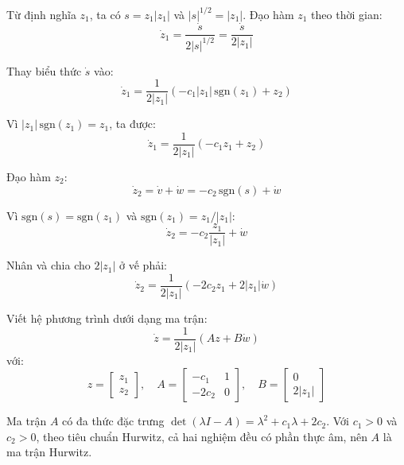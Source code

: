 \documentclass[12pt,a4paper]{report}
\begin{document}
Từ định nghĩa $z_1$, ta có $s = z_1 |z_1|$ và $|s|^{1/2} = |z_1|$. Đạo hàm $z_1$ theo thời gian:
\begin{equation}
\dot{z}_1 = \frac{\dot{s}}{2|s|^{1/2}} = \frac{\dot{s}}{2|z_1|}
\end{equation}

Thay biểu thức $\dot{s}$ vào:
\begin{equation}
\dot{z}_1 = \frac{1}{2|z_1|} \left( -c_1 |z_1| \, \text{sgn}(z_1) + z_2 \right)
\end{equation}

Vì $|z_1| \, \text{sgn}(z_1) = z_1$, ta được:
\begin{equation}
\dot{z}_1 = \frac{1}{2|z_1|} (-c_1 z_1 + z_2)
\end{equation}

Đạo hàm $z_2$:
\begin{equation}
\dot{z}_2 = \dot{v} + \dot{w} = -c_2 \, \text{sgn}(s) + \dot{w}
\end{equation}

Vì $\text{sgn}(s) = \text{sgn}(z_1)$ và $\text{sgn}(z_1) = z_1 / |z_1|$:
\begin{equation}
\dot{z}_2 = -c_2 \frac{z_1}{|z_1|} + \dot{w}
\end{equation}

Nhân và chia cho $2|z_1|$ ở vế phải:
\begin{equation}
\dot{z}_2 = \frac{1}{2|z_1|} (-2c_2 z_1 + 2|z_1| \dot{w})
\end{equation}

Viết hệ phương trình dưới dạng ma trận:
\begin{equation}
\dot{z} = \frac{1}{2|z_1|} \left( A z + B \dot{w} \right)
\end{equation}
với:
\begin{equation}
z = \begin{bmatrix} z_1 \\ z_2 \end{bmatrix}, \quad
A = \begin{bmatrix} -c_1 & 1 \\ -2c_2 & 0 \end{bmatrix}, \quad
B = \begin{bmatrix} 0 \\ 2|z_1| \end{bmatrix}
\end{equation}

Ma trận $A$ có đa thức đặc trưng $\det(\lambda I - A) = \lambda^2 + c_1 \lambda + 2c_2$. Với $c_1 > 0$ và $c_2 > 0$, theo tiêu chuẩn Hurwitz, cả hai nghiệm đều có phần thực âm, nên $A$ là ma trận Hurwitz.
\end{document}
